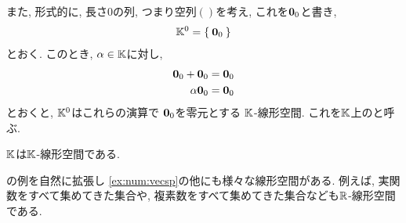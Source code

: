 \begin{example}
  また, 形式的に,
  長さ$0$の列, つまり空列$()$を考え,
  これを$\boldsymbol{0}_0$と書き,
  \begin{align*}
    \mathbb{K}^0
    =\Set{\boldsymbol{0}_0}
  \end{align*}
  とおく.
  このとき, $\alpha\in\mathbb{K}$に対し,
  \begin{align*}
    \boldsymbol{0}_0+\boldsymbol{0}_0&=\boldsymbol{0}_0\\
    \alpha \boldsymbol{0}_0&=\boldsymbol{0}_0
  \end{align*}
  とおくと,
  $\mathbb{K}^0$はこれらの演算で
  $\boldsymbol{0}_0$を零元とする
  $\mathbb{K}$-線形空間.
  これを$\mathbb{K}$上のと呼ぶ.
\end{example}

\begin{example}
$\mathbb{K}$は$\mathbb{K}$-線形空間である.
\end{example}

の例を自然に拡張し
\cref{ex:num:vecsp}の他にも様々な線形空間がある.
例えば,
実関数をすべて集めてきた集合や,
複素数をすべて集めてきた集合なども$\mathbb{R}$-線形空間である.




